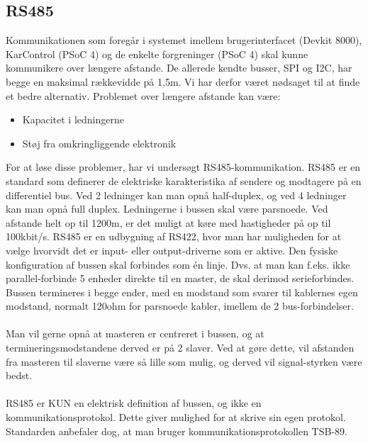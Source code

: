 \subsection{RS485}
Kommunikationen som foregår i systemet imellem brugerinterfacet (Devkit 8000), KarControl (PSoC 4) og de enkelte forgreninger (PSoC 4) skal kunne kommunikere over længere afstande. De allerede kendte busser, SPI og I2C, har begge en maksimal rækkevidde på 1,5m. Vi har derfor været nødsaget til at finde et bedre alternativ. Problemet over længere afstande kan være:

\begin{itemize}
\item Kapacitet i ledningerne
\item Støj fra omkringliggende elektronik
\end{itemize}

For at løse disse problemer, har vi undersøgt RS485-kommunikation. RS485 er en standard som definerer de elektriske karakteristika af sendere og modtagere på en differentiel bus. Ved 2 ledninger kan man opnå half-duplex, og ved 4 ledninger kan man opnå full duplex. Ledningerne i bussen skal være parsnoede. Ved afstande helt op til 1200m, er det muligt at køre med hastigheder på op til 100kbit/s. RS485 er en udbygning af RS422, hvor man har muligheden for at vælge hvorvidt det er input- eller output-driverne som er aktive. Den fysiske konfiguration af bussen skal forbindes som én linje.
Dvs. at man kan f.eks. ikke parallel-forbinde 5 enheder direkte til en master, de skal derimod serieforbindes. Bussen termineres i begge ender, med en modstand som svarer til kablernes egen modstand, normalt 120ohm for parsnoede kabler, imellem de 2 bus-forbindelser.
\\\\
Man vil gerne opnå at masteren er centreret i bussen, og at termineringsmodstandene derved er på 2 slaver. Ved at gøre dette, vil afstanden fra masteren til slaverne være så lille som mulig, og derved vil signal-styrken være bedst.
\\\\
RS485 er KUN en elektrisk definition af bussen, og ikke en kommunikationsprotokol. Dette giver mulighed for at skrive sin egen protokol. Standarden anbefaler dog, at man bruger kommunikationsprotokollen TSB-89.
